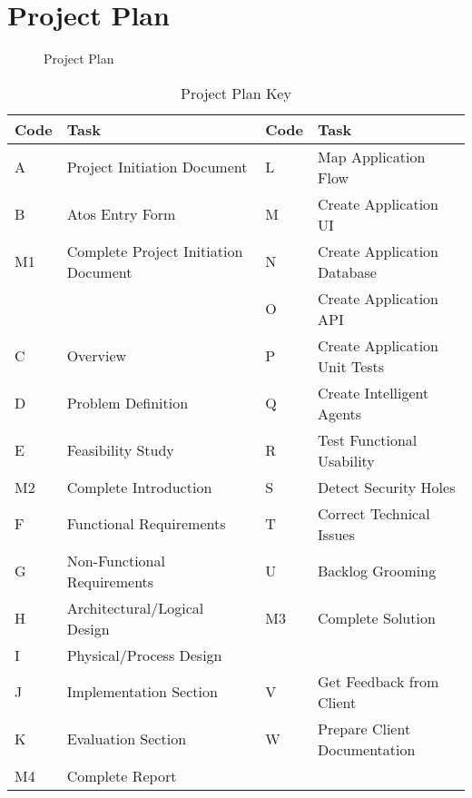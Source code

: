 \section{Project Plan}

\begin{figure}
  \centering
  \begin{minipage}{14cm}
    \centering
    
    \caption{Project Plan}
    \label{fig:project_plan}
  \end{minipage}
\end{figure}

\begin{table}
  \caption[Project Plan Key]{Project Plan Key \hfill}
  \label{tab:runtime}
  \scriptsize
  \begin{tabular*}{14.0cm}{p{1.0cm}p{6.0cm}p{1.0cm}p{6.0cm}}
    \toprule
    Code & Task & Code & Task \\
    \midrule
    A & Project Initiation Document & L & Map Application Flow \\
    B & Atos Entry Form & M & Create Application UI \\
    M1 & Complete Project Initiation Document & N & Create Application Database \\
     & & O & Create Application API \\
    C & Overview & P & Create Application Unit Tests \\
    D & Problem Definition & Q & Create Intelligent Agents \\
    E & Feasibility Study & R & Test Functional Usability \\
    M2 & Complete Introduction & S & Detect Security Holes \\
    F & Functional Requirements & T & Correct Technical Issues \\
    G & Non-Functional Requirements & U & Backlog Grooming \\
    H & Architectural/Logical Design & M3 & Complete Solution \\
    I & Physical/Process Design & & \\
    J & Implementation Section & V & Get Feedback from Client \\
    K & Evaluation Section & W & Prepare Client Documentation \\
    M4 & Complete Report \\
    \bottomrule
  \end{tabular*}
\end{table}
